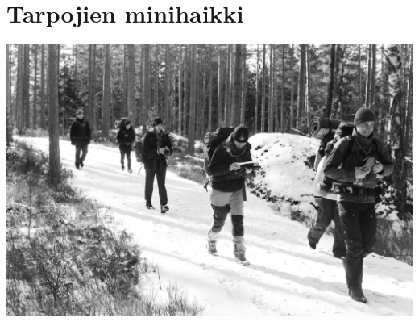 \section{Tarpojien minihaikki}


\noindent\includegraphics[width=1.0\linewidth,trim={0 0 0 1cm},clip]{assets/minihaikki4}

